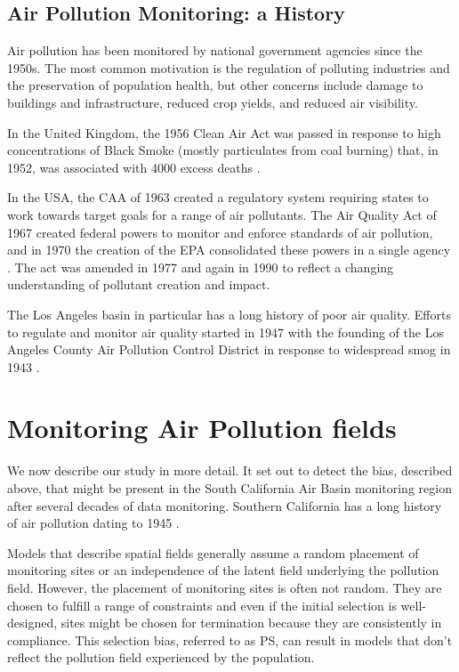 \documentclass{article}
\begin{document}
	\subsection{Air Pollution Monitoring: a History}
	\label{sec:apmonitoring}
	Air pollution has been monitored by national government agencies since the 1950s.  The most common motivation is the regulation of polluting industries and the preservation of population health, but other concerns include damage to buildings and infrastructure, reduced crop yields, and reduced air visibility.  
	
	In the United Kingdom, the 1956 Clean Air Act was passed in response to high concentrations of Black Smoke (mostly particulates from coal burning) that, in 1952, was associated with 4000 excess deaths \cite{shaddick2014case}.
	
	In the USA, the \ac{CAA} of 1963 created a regulatory system requiring states to work towards target goals for a range of air pollutants.  The Air Quality Act of 1967 created federal powers to monitor and enforce standards of air pollution, and in 1970 the creation of the \ac{EPA} consolidated these powers in a single agency %
	.  The act was amended in 1977 and again in 1990 to reflect a changing understanding of pollutant creation and impact.  
	
	The Los Angeles basin in particular has a long history of poor air quality.  Efforts to regulate and monitor air quality started in 1947 with the founding of the Los Angeles County Air Pollution Control District in response to widespread smog in 1943 
	.
	
	
	
	\section{Monitoring Air Pollution fields} \label{sec:monitoring}
	We now describe our study in more detail. It set out to detect the bias, described above, that might be present in the South California Air Basin monitoring region after several decades of data monitoring.  Southern California has a long history of air pollution dating to 1945 \citep{CASCAQMD:2015}.
	
	Models that describe spatial fields generally assume a random placement of monitoring sites or an independence of the latent field underlying the pollution field.  However, the placement of monitoring sites is often not random. They are chosen to fulfill a range of constraints and even if the initial selection is well-designed, sites might be chosen for termination because they are consistently in compliance.  This selection bias, referred to as \ac{PS}, can result in models that don't reflect the pollution field experienced by the population. 
	
\end{document}
